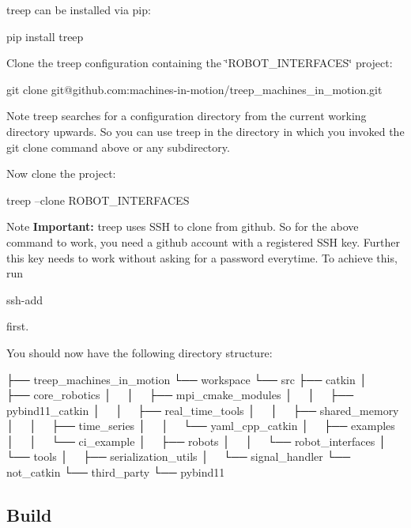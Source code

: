 treep can be installed via pip\+: \begin{DoxyVerb}pip install treep
\end{DoxyVerb}


Clone the treep configuration containing the \char`\"{}\+R\+O\+B\+O\+T\+\_\+\+I\+N\+T\+E\+R\+F\+A\+C\+E\+S\char`\"{} project\+: \begin{DoxyVerb}git clone git@github.com:machines-in-motion/treep_machines_in_motion.git
\end{DoxyVerb}


\begin{DoxyNote}{Note}
treep searches for a configuration directory from the current working directory upwards. So you can use treep in the directory in which you invoked the {\ttfamily git clone} command above or any subdirectory.
\end{DoxyNote}
Now clone the project\+: \begin{DoxyVerb}treep --clone ROBOT_INTERFACES
\end{DoxyVerb}


\begin{DoxyNote}{Note}
{\bfseries Important\+:} treep uses S\+SH to clone from github. So for the above command to work, you need a github account with a registered S\+SH key. Further this key needs to work without asking for a password everytime. To achieve this, run \begin{DoxyVerb}ssh-add
\end{DoxyVerb}

\end{DoxyNote}
first.

You should now have the following directory structure\+: \begin{DoxyVerb}├── treep_machines_in_motion
└── workspace
    └── src
        ├── catkin
        │   ├── core_robotics
        │   │   ├── mpi_cmake_modules
        │   │   ├── pybind11_catkin
        │   │   ├── real_time_tools
        │   │   ├── shared_memory
        │   │   ├── time_series
        │   │   └── yaml_cpp_catkin
        │   ├── examples
        │   │   └── ci_example
        │   ├── robots
        │   │   └── robot_interfaces
        │   └── tools
        │       ├── serialization_utils
        │       └── signal_handler
        └── not_catkin
            └── third_party
                └── pybind11
\end{DoxyVerb}


\subsection*{Build }


